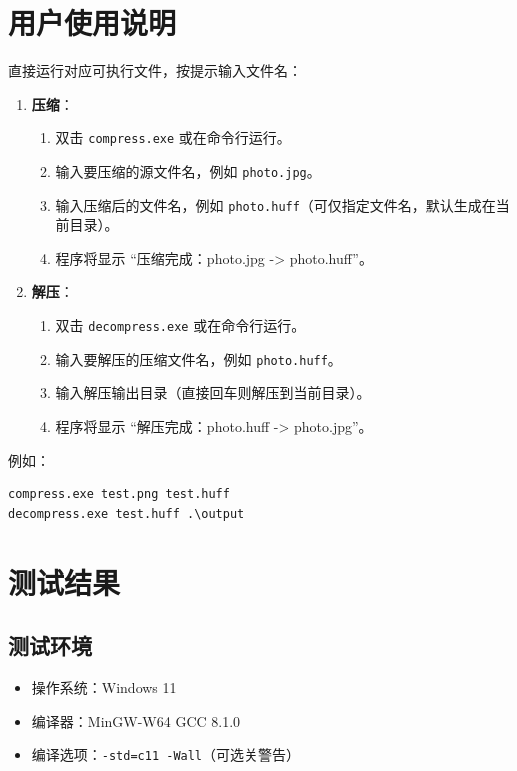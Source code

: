 \documentclass[UTF8]{ctexart}
\begin{document}
\section{用户使用说明}
直接运行对应可执行文件，按提示输入文件名：
\begin{enumerate}
    \item \textbf{压缩}：
        \begin{enumerate}
            \item 双击 \texttt{compress.exe} 或在命令行运行。
            \item 输入要压缩的源文件名，例如 \texttt{photo.jpg}。
            \item 输入压缩后的文件名，例如 \texttt{photo.huff}（可仅指定文件名，默认生成在当前目录）。
            \item 程序将显示 ``压缩完成：photo.jpg -> photo.huff''。
        \end{enumerate}
    \item \textbf{解压}：
        \begin{enumerate}
            \item 双击 \texttt{decompress.exe} 或在命令行运行。
            \item 输入要解压的压缩文件名，例如 \texttt{photo.huff}。
            \item 输入解压输出目录（直接回车则解压到当前目录）。
            \item 程序将显示 ``解压完成：photo.huff -> photo.jpg''。
        \end{enumerate}
\end{enumerate}

例如：
\begin{verbatim}
compress.exe test.png test.huff
decompress.exe test.huff .\output
\end{verbatim}

\section{测试结果}

\subsection{测试环境}
\begin{itemize}
    \item 操作系统：Windows 11
    \item 编译器：MinGW-W64 GCC 8.1.0
    \item 编译选项：\texttt{-std=c11 -Wall}（可选关警告）
\end{itemize}
\end{document}
